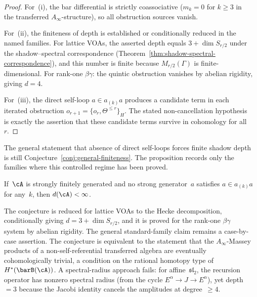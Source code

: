 \begin{proof}
For~(i), the bar differential is strictly coassociative ($m_k = 0$
for $k \geq 3$ in the transferred $A_\infty$-structure), so all
obstruction sources vanish.

For~(ii), the finiteness of depth is established or conditionally
reduced in the named families. For lattice VOAs, the asserted depth
equals $3 + \dim S_{r/2}$ under the shadow--spectral correspondence
(Theorem~\ref{thm:shadow-spectral-correspondence}), and this number is
finite because $M_{r/2}(\Gamma)$ is finite-dimensional.
For rank-one $\beta\gamma$: the quintic obstruction vanishes by
abelian rigidity, giving $d = 4$.

For~(iii), the direct self-loop $a \in a_{(k)}a$ produces a candidate
term in each iterated obstruction
$o_{r+1} = \{o_r, \Theta^{\leq r}\}_H$. The stated non-cancellation
hypothesis is exactly the assertion that these candidate terms survive
in cohomology for all~$r$.
\end{proof}

\begin{remark}
The general statement that absence of direct self-loops forces finite
shadow depth is still Conjecture~\ref{conj:general-finiteness}. The
proposition records only the families where this controlled regime has
been proved.
\end{remark}

\begin{conjecture}
\label{conj:general-finiteness}
\ClaimStatusConjectured
{}
If~$\cA$ is strongly finitely generated and no strong generator~$a$
satisfies $a \in a_{(k)}a$ for any~$k$, then $d(\cA) < \infty$.
\end{conjecture}

The conjecture is reduced for lattice VOAs to the Hecke
decomposition, conditionally giving $d = 3 + \dim S_{r/2}$, and it is
proved for the rank-one $\beta\gamma$ system by abelian rigidity. The
general standard-family claim remains a case-by-case assertion. The
conjecture is equivalent to the statement that
the $A_\infty$-Massey products of a non-self-referential
transferred algebra are eventually cohomologically trivial, a
condition on the rational homotopy type of~$H^*(\barB(\cA))$.
A spectral-radius approach fails: for affine~$\mathfrak{sl}_2$,
the recursion operator has nonzero spectral radius (from the cycle
$E^\alpha \to J \to E^\alpha$), yet depth~$= 3$ because the
Jacobi identity cancels the amplitudes at degree~$\geq 4$.


